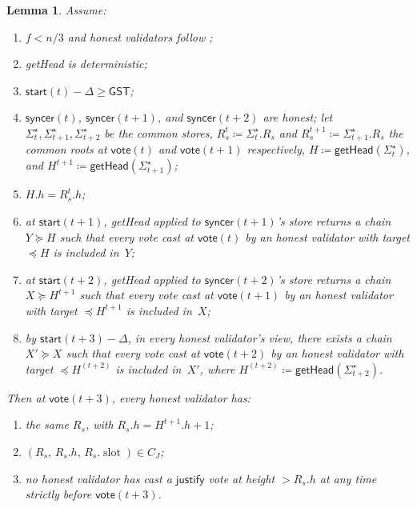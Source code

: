 \documentclass{article}
\newcommand{\slot}[0]{\ensuremath{\operatorname{\mathrm{slot}}}}
\newcommand{\just}{\ensuremath{\mathsf{justify}}\xspace}
\newcommand{\syncer}{\mathsf{syncer}}
\newcommand{\start}{\mathsf{start}}
\newcommand{\vote}{\mathsf{vote}}
\newcommand{\getHead}{\textsf{getHead}\xspace}
\theoremstyle{plain}
\newtheorem{lemma}{Lemma}
\theoremstyle{definition}
\theoremstyle{remark}
\newcommand{\GST}{\ensuremath{\mathsf{GST}}}
\begin{document}
\begin{lemma}
Assume:
\begin{enumerate}
  \item $f < n/3$ and honest validators follow ;
  \item \getHead is deterministic;
  \item $\start(t) - \Delta \geq \GST$;
  \item $\syncer(t)$, $\syncer(t+1)$, and $\syncer(t+2)$ are honest; let $\Sigma^\star_t, \Sigma^\star_{t+1}, \Sigma^\star_{t+2}$ be the common stores, $R_s^t \coloneqq \Sigma^\star_t.R_s$ and $R_s^{t+1} \coloneqq \Sigma^\star_{t+1}.R_s$ the common roots at $\vote(t)$ and $\vote(t+1)$ respectively, $H \coloneqq \getHead(\Sigma^\star_t)$, and $H^{t+1} \coloneqq \getHead(\Sigma^\star_{t+1})$;
  \item $H.h = R_s^t.h$;
  \item at $\start(t+1)$, \getHead applied to $\syncer(t+1)$'s store returns a chain $Y \succeq H$ such that every vote cast at $\vote(t)$ by an honest validator with target $\preceq H$ is included in~$Y$;
  \item at $\start(t+2)$, \getHead applied to $\syncer(t+2)$'s store returns a chain $X \succeq H^{t+1}$ such that every vote cast at $\vote(t+1)$ by an honest validator with target $\preceq H^{t+1}$ is included in~$X$;
  \item by $\start(t+3) - \Delta$, in every honest validator's view, there exists a chain $X' \succeq X$ such that every vote cast at $\vote(t+2)$ by an honest validator with target $\preceq H^{(t+2)}$ is included in~$X'$, where $H^{(t+2)} \coloneqq \getHead(\Sigma^\star_{t+2})$.
\end{enumerate}
Then at $\vote(t+3)$, every honest validator has:
\begin{enumerate}
  \item the same $R_s$, with $R_s.h = H^{t+1}.h + 1$;
  \item $(R_s,\, R_s.h,\, R_s.\slot) \in C_J$;
  \item no honest validator has cast a \just vote at height $> R_s.h$ at any time strictly before $\vote(t+3)$.
\end{enumerate}
\end{lemma}
\end{document}
